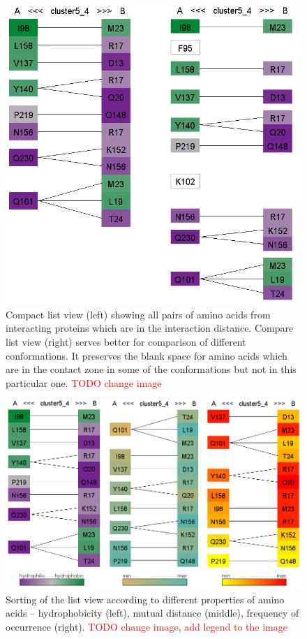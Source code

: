 \documentclass[journal]{vgtc}                %
\begin{document}
\begin{figure}[bt]
  \centering
  \includegraphics[width=1.0\columnwidth]{list.png}
  \caption{Compact list view (left) showing all pairs of amino acids from interacting proteins which are in the interaction distance. Compare list view (right) serves better for comparison of different conformations. It preserves the blank space for amino acids which are in the contact zone in some of the conformations but not in this particular one. \textcolor{red}{TODO change image}}
  \label{fig:list}
\end{figure}

\begin{figure}[bt]
  \centering
  \includegraphics[width=1.0\columnwidth]{sorting.png}
  \caption{Sorting of the list view according to different properties of amino acids -- hydrophobicity (left), mutual distance (middle), frequency of occurrence (right). \textcolor{red}{TODO change image, add legend to the image}}
  \label{fig:sorting}
\end{figure}
\end{document}
